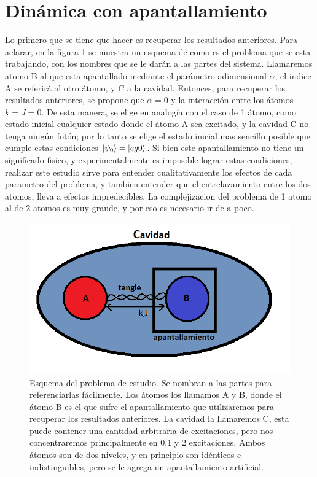 \section{Dinámica con apantallamiento}

Lo primero que se tiene que hacer es recuperar los resultados anteriores. Para aclarar, en la figura \ref{fig4:diagrama esquematico} se muestra un esquema de como es el problema que se esta trabajando, con los nombres que se le darán a las partes del sistema. Llamaremos atomo B al que esta apantallado mediante el parámetro adimensional $\alpha$, el indice A se referirá al otro átomo, y C a la cavidad. Entonces, para recuperar los resultados anteriores, se propone que $\alpha=0$ y la interacción entre los átomos $k=J=0$. De esta manera, se elige en analogía con el caso de 1 átomo, como estado inicial cualquier estado donde el átomo A sea excitado, y la cavidad C no tenga ningún fotón; por lo tanto se elige el estado inicial mas sencillo posible que cumple estas condiciones $\ket{\psi_0}=\ket{eg0}$. Si bien este apantallamiento no tiene un significado fisico, y experimentalmente es imposible lograr estas condiciones, realizar este estudio sirve para entender cualitativamente los efectos de cada parametro del problema, y tambien entender que el entrelazamiento entre los dos atomos, lleva a efectos impredecibles. La complejizacion del problema de 1 atomo al de 2 atomos es muy grande, y por eso es necesario ir de a poco.
\begin{figure}[H]
    \begin{minipage}[c]{0.67\textwidth}
        \includegraphics[width=\textwidth]{figuras/ch4/diagrama esquematico.png}
    \end{minipage}\hfill
    \begin{minipage}[c]{0.3\textwidth}
    \caption{Esquema del problema de estudio. Se nombran a las partes para referenciarlas fácilmente. Los átomos los llamamos A y B, donde el átomo B es el que sufre el apantallamiento que utilizaremos para recuperar los resultados anteriores. La cavidad la llamaremos C, esta puede contener una cantidad arbitraria de excitaciones, pero nos concentraremos principalmente en 0,1 y 2 excitaciones. Ambos átomos son de dos niveles, y en principio son idénticos e indistinguibles, pero se le agrega un apantallamiento artificial.
         } \label{fig4:diagrama esquematico}
  \end{minipage}
\end{figure}
